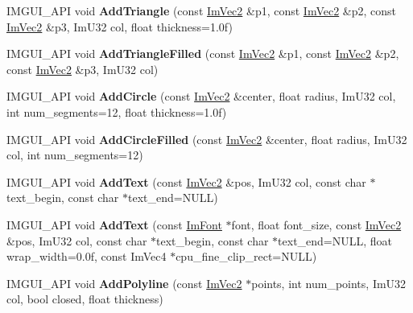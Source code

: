 \begin{DoxyCompactItemize}
I\+M\+G\+U\+I\+\_\+\+A\+PI void {\bfseries Add\+Triangle} (const \hyperlink{structImVec2}{Im\+Vec2} \&p1, const \hyperlink{structImVec2}{Im\+Vec2} \&p2, const \hyperlink{structImVec2}{Im\+Vec2} \&p3, Im\+U32 col, float thickness=1.\+0f)
\item 
\mbox{\label{structImDrawList_af1dd4a3888034c5f71b66a38e44edf31}} 
I\+M\+G\+U\+I\+\_\+\+A\+PI void {\bfseries Add\+Triangle\+Filled} (const \hyperlink{structImVec2}{Im\+Vec2} \&p1, const \hyperlink{structImVec2}{Im\+Vec2} \&p2, const \hyperlink{structImVec2}{Im\+Vec2} \&p3, Im\+U32 col)
\item 
\mbox{\label{structImDrawList_a489b7a51215c71bc949428b2979df72f}} 
I\+M\+G\+U\+I\+\_\+\+A\+PI void {\bfseries Add\+Circle} (const \hyperlink{structImVec2}{Im\+Vec2} \&center, float radius, Im\+U32 col, int num\+\_\+segments=12, float thickness=1.\+0f)
\item 
\mbox{\label{structImDrawList_aa0deb7afb981f8984e504460eb1dc7d0}} 
I\+M\+G\+U\+I\+\_\+\+A\+PI void {\bfseries Add\+Circle\+Filled} (const \hyperlink{structImVec2}{Im\+Vec2} \&center, float radius, Im\+U32 col, int num\+\_\+segments=12)
\item 
\mbox{\label{structImDrawList_ac5221bd86b3429f6d5b6e6ffe454942d}} 
I\+M\+G\+U\+I\+\_\+\+A\+PI void {\bfseries Add\+Text} (const \hyperlink{structImVec2}{Im\+Vec2} \&pos, Im\+U32 col, const char $\ast$text\+\_\+begin, const char $\ast$text\+\_\+end=N\+U\+LL)
\item 
\mbox{\label{structImDrawList_a0a226cbe9bb1480428e145d8535cda26}} 
I\+M\+G\+U\+I\+\_\+\+A\+PI void {\bfseries Add\+Text} (const \hyperlink{structImFont}{Im\+Font} $\ast$font, float font\+\_\+size, const \hyperlink{structImVec2}{Im\+Vec2} \&pos, Im\+U32 col, const char $\ast$text\+\_\+begin, const char $\ast$text\+\_\+end=N\+U\+LL, float wrap\+\_\+width=0.\+0f, const Im\+Vec4 $\ast$cpu\+\_\+fine\+\_\+clip\+\_\+rect=\+N\+U\+L\+L)
\item 
\mbox{\label{structImDrawList_aff952cdd83c6f0440dd00af0d653ca02}} 
I\+M\+G\+U\+I\+\_\+\+A\+PI void {\bfseries Add\+Polyline} (const \hyperlink{structImVec2}{Im\+Vec2} $\ast$points, int num\+\_\+points, Im\+U32 col, bool closed, float thickness)

\end{DoxyCompactItemize}

